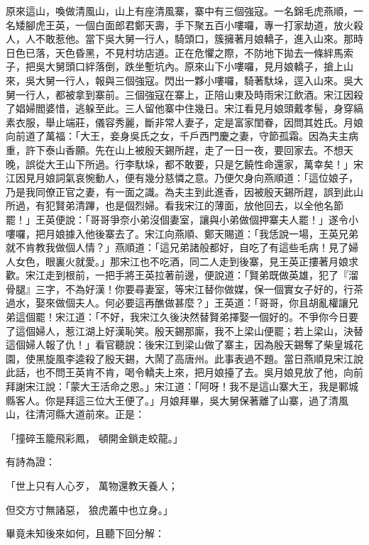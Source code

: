 \begin{showcontents}{}
原來這山，喚做清風山，山上有座清風寨，寨中有三個強寇。一名錦毛虎燕順，一名矮腳虎王英，一個白面郎君鄭天壽，手下聚五百小嘍囉，專一打家劫道，放火殺人，人不敢惹他。當下吳大舅一行人，騎頭口，簇擁著月娘轎子，進入山來。那時日色已落，天色昏黑，不見村坊店道。正在危懼之際，不防地下拋去一條絆馬索子，把吳大舅頭口絆落倒，跌坐塹坑內。原來山下小嘍囉，見月娘轎子，搶上山來，吳大舅一行人，報與三個強寇。閃出一夥小嘍囉，騎著馱垛，逕入山來。吳大舅一行人，都被拿到寨前。三個強寇在寨上，正陪山東及時雨宋江飲酒。宋江因殺了娼婦閻婆惜，逃躲至此。三人留他寨中住幾日。宋江看見月娘頭戴孝髻，身穿縞素衣服，舉止端莊，儀容秀麗，斷非常人妻子，定是富家閨眷，因問其姓氏。月娘向前道了萬福：「大王，妾身吳氏之女，千戶西門慶之妻，守節孤霜。因為夫主病重，許下泰山香願。先在山上被殷天錫所趕，走了一日一夜，要回家去。不想天晚，誤從大王山下所過。行李馱垛，都不敢要，只是乞饒性命還家，萬幸矣！」宋江因見月娘詞氣哀惋動人，便有幾分慈憐之意。乃便欠身向燕順道：「這位娘子，乃是我同僚正官之妻，有一面之識。為夫主到此進香，因被殷天錫所趕，誤到此山所過，有犯賢弟清蹕，也是個烈婦。看我宋江的薄面，放他回去，以全他名節罷！」王英便說：「哥哥爭奈小弟沒個妻室，讓與小弟做個押寨夫人罷！」遂令小嘍囉，把月娘據入他後寨去了。宋江向燕順、鄭天賜道：「我恁說一場，王英兄弟就不肯教我做個人情？」燕順道：「這兄弟諸般都好，自吃了有這些毛病！見了婦人女色，眼裏火就愛。」那宋江也不吃酒，同二人走到後寨，見王英正摟著月娘求歡。宋江走到根前，一把手將王英拉著前邊，便說道：「賢弟既做英雄，犯了『溜骨腿』三字，不為好漢！你要尋妻室，等宋江替你做媒，保一個實女子好的，行茶過水，娶來做個夫人。何必要這再醮做甚麼？」王英道：「哥哥，你且胡亂權讓兄弟這個罷！宋江道：「不好，我宋江久後決然替賢弟擇娶一個好的。不爭你今日要了這個婦人，惹江湖上好漢恥笑。殷天錫那廝，我不上梁山便罷；若上梁山，決替這個婦人報了仇！」看官聽說：後宋江到梁山做了寨主，因為殷天錫奪了柴皇城花園，使黑旋風李逵殺了殷天錫，大鬧了高唐州。此事表過不題。當日燕順見宋江說此話，也不問王英肯不肯，喝令轎夫上來，把月娘擡了去。吳月娘見放了他，向前拜謝宋江說：「蒙大王活命之恩。」宋江道：「阿呀！我不是這山寨大王，我是鄆城縣客人。你是拜這三位大王便了。」月娘拜畢，吳大舅保著離了山寨，過了清風山，往清河縣大道前來。正是：

「撞碎玉籠飛彩鳳，  頓開金鎖走蛟龍。」

有詩為證：

「世上只有人心歹，  萬物還教天養人；

但交方寸無諸惡，  狼虎叢中也立身。」

畢竟未知後來如何，且聽下回分解：





\end{showcontents}


